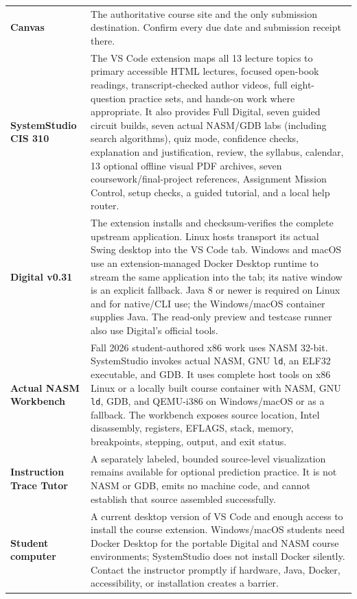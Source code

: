 \documentclass[10pt,letterpaper]{article}
\begin{document}
\begin{tabularx}{\textwidth}{>{\bfseries}p{}X}
Canvas & The authoritative course site and the only submission destination. Confirm every due date and submission receipt there.\\
SystemStudio CIS 310 & The VS Code extension maps all 13 lecture topics to primary accessible HTML lectures, focused open-book readings, transcript-checked author videos, full eight-question practice sets, and hands-on work where appropriate. It also provides Full Digital, seven guided circuit builds, seven actual NASM/GDB labs (including search algorithms), quiz mode, confidence checks, explanation and justification, review, the syllabus, calendar, 13 optional offline visual PDF archives, seven coursework/final-project references, Assignment Mission Control, setup checks, a guided tutorial, and a local help router.\\
Digital v0.31 & The extension installs and checksum-verifies the complete upstream application. Linux hosts transport its actual Swing desktop into the VS Code tab. Windows and macOS use an extension-managed Docker Desktop runtime to stream the same application into the tab; its native window is an explicit fallback. Java 8 or newer is required on Linux and for native/CLI use; the Windows/macOS container supplies Java. The read-only preview and testcase runner also use Digital's official tools.\\
Actual NASM Workbench & Fall 2026 student-authored x86 work uses NASM 32-bit. SystemStudio invokes actual NASM, GNU \texttt{ld}, an ELF32 executable, and GDB. It uses complete host tools on x86 Linux or a locally built course container with NASM, GNU \texttt{ld}, GDB, and QEMU-i386 on Windows/macOS or as a fallback. The workbench exposes source location, Intel disassembly, registers, EFLAGS, stack, memory, breakpoints, stepping, output, and exit status.\\
Instruction Trace Tutor & A separately labeled, bounded source-level visualization remains available for optional prediction practice. It is not NASM or GDB, emits no machine code, and cannot establish that source assembled successfully.\\
Student computer & A current desktop version of VS Code and enough access to install the course extension. Windows/macOS students need Docker Desktop for the portable Digital and NASM course environments; SystemStudio does not install Docker silently. Contact the instructor promptly if hardware, Java, Docker, accessibility, or installation creates a barrier.\\
\end{tabularx}
\end{document}
